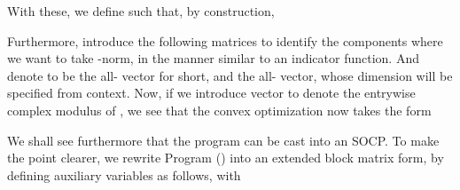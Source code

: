 With these, we define
%
%
such that, by construction,
%

Furthermore, introduce the following matrices to identify the components where we want to take -norm, in the manner similar to an indicator function.
%
%
And denote  to be the all- vector for short, and  the all- vector, whose dimension will be specified from context.
Now, if we introduce vector 
%
%
to denote the entrywise complex modulus of , we see that the convex optimization now takes the form
%

\stopsection

\startsection [title={Second Order Cone Programming}]

We shall see furthermore that the program can be cast into an SOCP.
To make the point clearer, we rewrite Program () into an extended block matrix form, by defining auxiliary variables as follows,
%
%
with
%

